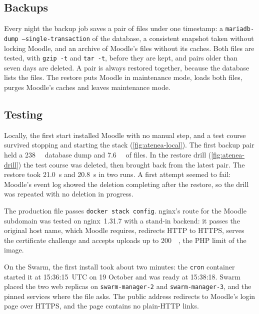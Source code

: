 \subsection{Backups}

Every night the backup job saves a pair of files under one timestamp: a
\texttt{mariadb-dump --single-transaction} of the database, a
consistent snapshot taken without locking Moodle, and an archive of
Moodle's files without its caches. Both files are tested, with
\texttt{gzip -t} and \texttt{tar -t}, before they are kept, and pairs
older than seven days are deleted. A pair is always restored together,
because the database lists the files. The restore puts Moodle in
maintenance mode, loads both files, purges Moodle's caches and leaves
maintenance mode.

\subsection{Testing}

Locally, the first start installed Moodle with no manual step, and a
test course survived stopping and starting the stack
(\cref{fig:atenea-local}). The first backup pair held a
\qty{238}{\kilo\byte} database dump and \qty{7.6}{\kilo\byte} of files.
In the restore drill (\cref{fig:atenea-drill}) the test course was
deleted, then brought back from the latest pair. The restore took
\qty{21.0}{\second} and \qty{20.8}{\second} in two runs. A first attempt
seemed to fail: Moodle's event log showed the deletion completing after
the restore, so the drill was repeated with no deletion in progress.

The production file passes \texttt{docker stack config}. nginx's route
for the Moodle subdomain was tested on nginx~1.31.7 with a stand-in
backend: it passes the original host name, which Moodle requires,
redirects HTTP to HTTPS, serves the certificate challenge and accepts
uploads up to \qty{200}{\mega\byte}, the PHP limit of the image.

On the Swarm, the first install took about two minutes: the
\texttt{cron} container started it at 15:36:15~UTC on 19 October and
was ready at 15:38:18. Swarm placed the two web replicas on
\texttt{swarm-manager-2} and \texttt{swarm-manager-3}, and the pinned
services where the file asks. The public address redirects to Moodle's
login page over HTTPS, and the page contains no plain-HTTP links.

